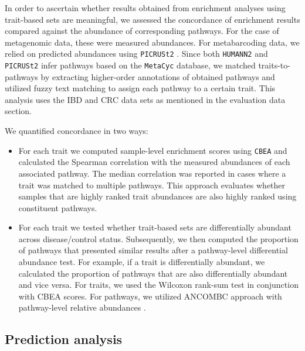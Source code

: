 \documentclass{bmcart}
\begin{document}
In order to ascertain whether results obtained from enrichment analyses using trait-based sets are meaningful, we assessed the concordance of enrichment results compared against the abundance of corresponding pathways. For the case of metagenomic data, these were measured abundances. For metabarcoding data, we relied on predicted abundances using \texttt{PICRUSt2} \cite{douglas2020picrust2}. Since both \texttt{HUMANN2} and \texttt{PICRUSt2} infer pathways based on the \texttt{MetaCyc} \cite{caspi2020metacyc} database, we matched traits-to-pathways by extracting higher-order annotations of obtained pathways and utilized fuzzy text matching to assign each pathway to a certain trait. This analysis uses the IBD and CRC data sets as mentioned in the evaluation data section.  

\noindent We quantified concordance in two ways: 
\begin{itemize}
    \item For each trait we computed sample-level enrichment scores using \texttt{CBEA} and calculated the Spearman correlation with the measured abundances of each associated pathway. The median correlation was reported in cases where a trait was matched to multiple pathways. This approach evaluates whether samples that are highly ranked trait abundances are also highly ranked using constituent pathways.  
    \item  For each trait we tested whether trait-based sets are differentially abundant across disease/control status. Subsequently, we then computed the proportion of pathways that presented similar results after a pathway-level differential abundance test. For example, if a trait is differentially abundant, we calculated the proportion of pathways that are also differentially abundant and vice versa. For traits, we used the Wilcoxon rank-sum test in conjunction with CBEA scores. For pathways, we utilized ANCOMBC approach with pathway-level relative abundances \cite{missing}. 
\end{itemize} 

\subsection*{Prediction analysis}  
\end{document}
